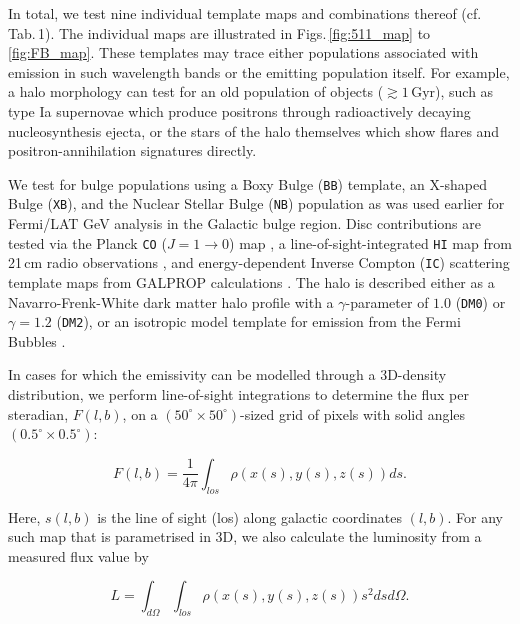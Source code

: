 \documentclass[doublespace,draft,nopageskip]{VTthesis} %
\newcommand{\mrm}[1]{\mathrm{#1}}
\begin{document}
\begin{appendices}
	In total, we test nine individual template maps and combinations thereof (cf. Tab.\,1).
	The individual maps are illustrated in Figs.\,\ref{fig:511_map} to \ref{fig:FB_map}.
	These templates may trace either populations associated with emission in such wavelength bands or the emitting population itself.
	For example, a halo morphology can test for an old population of objects ($\gtrsim 1\,\mrm{Gyr}$), such as type Ia supernovae which produce positrons through radioactively decaying nucleosynthesis ejecta, or the stars of the halo themselves which show flares and positron-annihilation signatures directly.
	
	We test for bulge populations using a Boxy Bulge (\texttt{BB}) template, an X-shaped Bulge (\texttt{XB}), and the Nuclear Stellar Bulge (\texttt{NB}) population as was used earlier \cite[e.g., ][]{Macias2018_LATGeV,Bartels2018_GeVexcess_stars} for Fermi/LAT GeV analysis in the Galactic bulge region.
	Disc contributions are tested via the Planck \texttt{CO} ($J=1 \rightarrow 0$) map \citep{Planck2016_foregrounds}, a line-of-sight-integrated \texttt{HI} map from 21\,cm radio observations \citep{Dickey1990_HI}, and energy-dependent Inverse Compton (\texttt{IC}) scattering template maps from GALPROP calculations \citep{Strong2007_GALPROP}.
	The halo is described either as a Navarro-Frenk-White \citep{Navarro1997_NFW} dark matter halo profile with a $\gamma$-parameter of $1.0$ (\texttt{DM0}) or $\gamma=1.2$ (\texttt{DM2}), or an isotropic model template for emission from the Fermi Bubbles \citep[\texttt{FB}][]{Su2010_fermibubbles}.
	
	In cases for which the emissivity can be modelled through a 3D-density distribution, we perform line-of-sight integrations to determine the flux per steradian, $F(l,b)$, on a $(50^{\circ} \times 50^{\circ})$-sized grid of pixels with solid angles $(0.5^{\circ} \times 0.5^{\circ})$: 
	
	\begin{equation}
		F(l,b) = \frac{1}{4\pi} \int_{los} \rho(x(s),y(s),z(s)) ds\mrm{.}
		\label{eq:los_integral}
	\end{equation}
	
	\noindent Here, $s(l,b)$ is the line of sight (los) along galactic coordinates $(l,b)$.
	For any such map that is parametrised in 3D, we also calculate the luminosity from a measured flux value by 
	
	\begin{equation}
		L = \int_{d\Omega} \int_{los} \rho(x(s),y(s),z(s)) s^2 ds d\Omega\mrm{.}
		\label{eq:luminosity}
	\end{equation}
	

\end{appendices}
\end{document}
